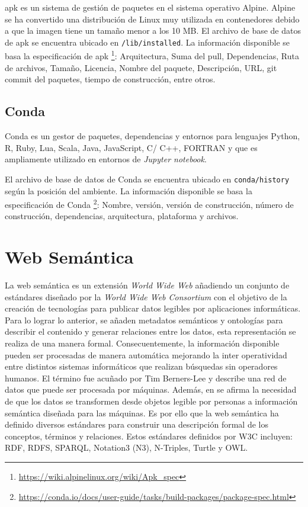 apk es un sistema de gestión de paquetes en el sistema operativo Alpine. Alpine se ha convertido una distribución de Linux muy utilizada en contenedores debido a que la imagen tiene un tamaño menor a los 10 MB.
El archivo de base de datos de apk se encuentra ubicado en \verb|/lib/installed|. La información disponible se basa la especificación de apk \footnote{\url{https://wiki.alpinelinux.org/wiki/Apk_spec}}: Arquitectura, Suma del pull, Dependencias, Ruta de archivos, Tamaño, Licencia, Nombre del paquete, Descripción, URL, git commit del paquetes, tiempo de construcción, entre otros. 

\subsection{Conda}\label{sub:conda}
Conda es un gestor de paquetes, dependencias y entornos para lenguajes Python, R, Ruby, Lua, Scala, Java, JavaScript, C/ C++, FORTRAN y que es ampliamente utilizado en entornos de \textit{Jupyter notebook}.

El archivo de base de datos de Conda se encuentra ubicado en \verb|conda/history| según la posición del ambiente. La información disponible se basa la especificación de Conda \footnote{\url{https://conda.io/docs/user-guide/tasks/build-packages/package-spec.html}}: Nombre, versión, versión de construcción, número de construcción, dependencias, arquitectura, plataforma y archivos.

\section{Web Semántica}

La web semántica es un extensión \emph{World Wide Web} añadiendo un conjunto de estándares diseñado por la \emph{World Wide Web Consortium} con el objetivo de la creación de tecnologías para publicar datos legibles por aplicaciones informáticas. 
Para lo lograr lo anterior, se añaden metadatos semánticos y ontologías para describir el contenido y generar relaciones entre los datos, esta representación se realiza de una manera formal.
Consecuentemente, la información disponible pueden ser procesadas de manera automática mejorando la inter operatividad entre distintos sistemas informáticos que realizan búsquedas sin operadores humanos.
El término fue acuñado por Tim Berners-Lee y describe una red de datos que puede ser procesada por máquinas. Además, en \cite{berners1992world} se afirma la necesidad de que los datos se transformen desde objetos legible por personas a información semántica diseñada para las máquinas.
Es por ello que la web semántica ha definido diversos estándares para construir una descripción formal de los conceptos, términos y relaciones. Estos estándares definidos por W3C incluyen: RDF, RDFS, SPARQL, Notation3 (N3), N-Triples, Turtle y OWL.

